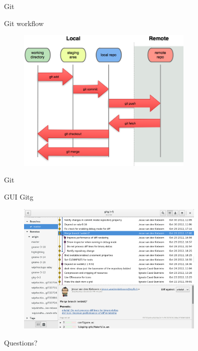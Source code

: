 \documentclass[10pt]{beamer}
\begin{document}
\begin{frame}{Git}
   \begin{alertblock}{Git workflow}
    	\begin{figure}[t]
      \includegraphics[width=0.75\textwidth]{git_workflow.png}
    \end{figure}
   \end{alertblock}
\end{frame}

\begin{frame}{Git}
   \begin{alertblock}{GUI Gitg}
    	\begin{figure}[t]
      \includegraphics[width=0.8\textwidth]{gitg_gui.png}
    \end{figure}
   \end{alertblock}
\end{frame}



\begin{frame}[standout]
  Questions?
\end{frame}
\end{document}
